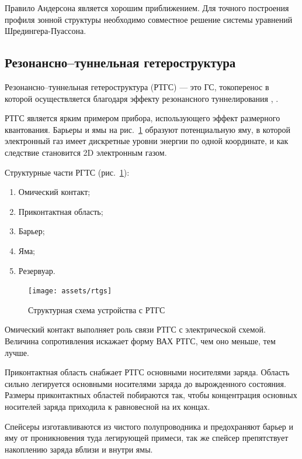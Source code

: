 Правило Андерсона является хорошим приближением. Для точного построения профиля зонной структуры необходимо совместное решение системы уравнений Шредингера-Пуассона.


\subsection{Резонансно--туннельная гетероструктура}
Резонансно--туннельная гетероструктура (РТГС) --- это ГС, токоперенос в которой осуществляется благодаря эффекту резонансного туннелирования \cite{Usanov}, \cite{Moskaluk}.

РТГС является ярким примером прибора, использующего эффект размерного квантования. Барьеры и ямы на рис.~\ref{img:rtgs} образуют потенциальную яму, в которой электронный газ имеет дискретные уровни энергии по одной координате, и как следствие становится 2D электронным газом.

Структурные части РГТС (рис.~\ref{img:rtgs}):
\begin{enumerate}
  \item Омический контакт;
  \item Приконтактная область;
  \item Барьер;
  \item Яма;
  \item Резервуар.
\end{enumerate}

\begin{figure}[h]
  \centering
  \texttt{[image: assets/rtgs]}
  \caption{Структурная схема устройства с РТГС}
  \label{img:rtgs}
\end{figure}

Омический контакт выполняет роль связи РТГС с электрической схемой. Величина сопротивления искажает форму ВАХ РТГС, чем оно меньше, тем лучше.

Приконтактная область снабжает РТГС основными носителями заряда. Область сильно легируется основными носителями заряда до вырожденного состояния. Размеры приконтактных областей побираются так, чтобы концентрация основных носителей заряда приходила к равновесной на их концах.

Спейсеры изготавливаются из чистого полупроводника и предохраняют барьер и яму от проникновения туда легирующей примеси, так же спейсер препятствует накоплению заряда вблизи и внутри ямы.

